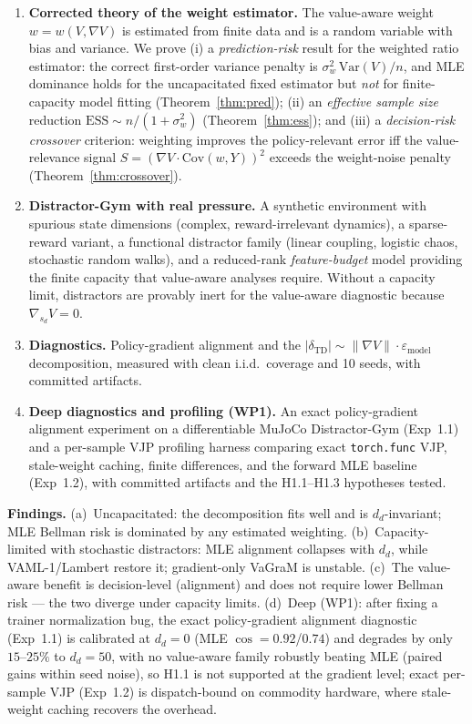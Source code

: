 \documentclass{article}
\theoremstyle{plain}
\begin{document}
\begin{enumerate}
\item \textbf{Corrected theory of the weight estimator.} The value-aware weight
  $w = w(V, \nabla V)$ is estimated from finite data and is a random variable with bias
  and variance. We prove (i) a \emph{prediction-risk} result for the weighted ratio
  estimator: the correct first-order variance penalty is
  $\sigma_w^2\,\mathrm{Var}(V)/n$, and MLE dominance holds for the uncapacitated fixed
  estimator but \emph{not} for finite-capacity model fitting (Theorem~\ref{thm:pred});
  (ii) an \emph{effective sample size} reduction $\mathrm{ESS} \sim n/(1+\sigma_w^2)$
  (Theorem~\ref{thm:ess}); and (iii) a \emph{decision-risk crossover} criterion:
  weighting improves the policy-relevant error iff the value-relevance signal
  $S = \left(\nabla V \cdot \mathrm{Cov}(w, Y)\right)^2$ exceeds the weight-noise penalty
  (Theorem~\ref{thm:crossover}).
\item \textbf{Distractor-Gym with real pressure.} A synthetic environment with spurious
  state dimensions (complex, reward-irrelevant dynamics), a sparse-reward variant, a
  functional distractor family (linear coupling, logistic chaos, stochastic random
  walks), and a reduced-rank \emph{feature-budget} model providing the finite capacity
  that value-aware analyses require. Without a capacity limit, distractors are provably
  inert for the value-aware diagnostic because $\nabla_{s_d} V = 0$.
\item \textbf{Diagnostics.} Policy-gradient alignment and the
  $\lvert\delta_{\mathrm{TD}}\rvert \sim \lVert \nabla V\rVert \cdot \varepsilon_{\mathrm{model}}$
  decomposition, measured with clean i.i.d.\ coverage and 10 seeds, with committed
  artifacts.
\item \textbf{Deep diagnostics and profiling (WP1).} An exact policy-gradient alignment
  experiment on a differentiable MuJoCo Distractor-Gym (Exp~1.1) and a per-sample VJP
  profiling harness comparing exact \texttt{torch.func} VJP, stale-weight caching, finite
  differences, and the forward MLE baseline (Exp~1.2), with committed artifacts and the
  H1.1--H1.3 hypotheses tested.
\end{enumerate}

\textbf{Findings.}
(a)~Uncapacitated: the decomposition fits well and is $d_d$-invariant; MLE Bellman risk
is dominated by any estimated weighting.
(b)~Capacity-limited with stochastic distractors: MLE alignment collapses with $d_d$,
while VAML-1/Lambert restore it; gradient-only VaGraM is unstable.
(c)~The value-aware benefit is decision-level (alignment) and does not require lower
Bellman risk --- the two diverge under capacity limits.
(d)~Deep (WP1): after fixing a trainer normalization bug, the exact policy-gradient
alignment diagnostic (Exp~1.1) is calibrated at $d_d = 0$ (MLE $\cos = 0.92$/$0.74$) and
degrades by only $15$--$25\%$ to $d_d = 50$, with no value-aware family robustly beating
MLE (paired gains within seed noise), so H1.1 is not supported at the gradient level;
exact per-sample VJP (Exp~1.2) is dispatch-bound on commodity hardware, where
stale-weight caching recovers the overhead.
\end{document}
